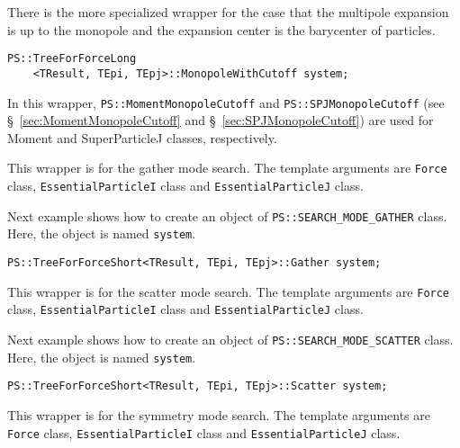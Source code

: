 There is the more specialized wrapper for the case that the multipole expansion is up to the monopole and the expansion center is the barycenter of particles.

\begin{screen}
\begin{verbatim}
PS::TreeForForceLong
    <TResult, TEpi, TEpj>::MonopoleWithCutoff system;
\end{verbatim}
\end{screen}

In this wrapper, \texttt{PS::MomentMonopoleCutoff} and \texttt{PS::SPJMonopoleCutoff} (see \S~\ref{sec:MomentMonopoleCutoff} and \S~\ref{sec:SPJMonopoleCutoff}) are used for Moment and SuperParticleJ classes, respectively.


This wrapper is for the gather mode search. The template arguments are {\tt Force} class, {\tt EssentialParticleI} class and {\tt EssentialParticleJ} class.

Next example shows how to create an object of {\tt PS::SEARCH\_MODE\_GATHER} class.  Here, the object is named {\tt system}.

\begin{screen}
\begin{verbatim}
PS::TreeForForceShort<TResult, TEpi, TEpj>::Gather system;
\end{verbatim}
\end{screen}



This wrapper is for the scatter mode search. The template arguments are {\tt Force} class, {\tt EssentialParticleI} class and {\tt EssentialParticleJ} class.

Next example shows how to create an object of {\tt PS::SEARCH\_MODE\_SCATTER} class.  Here, the object is named {\tt system}.

\begin{screen}
\begin{verbatim}
PS::TreeForForceShort<TResult, TEpi, TEpj>::Scatter system;
\end{verbatim}
\end{screen}


This wrapper is for the symmetry mode search.  The template arguments are {\tt Force} class, {\tt EssentialParticleI} class and {\tt EssentialParticleJ} class.

